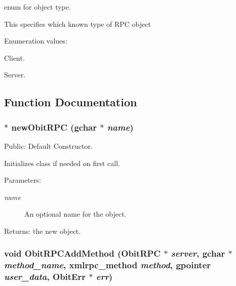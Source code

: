 enum for object type. 

This specifies which known type of RPC object \begin{Desc}
\item[Enumeration values: ]\par
\begin{description}
\item[{\em 
OBIT\_\-RPC\_\-Client\label{ObitRPC_8h_a26a6}
}]Client. \item[{\em 
OBIT\_\-RPC\_\-Server\label{ObitRPC_8h_a26a7}
}]Server. \end{description}
\end{Desc}



\subsection{Function Documentation}
\subsubsection{$\ast$ new\-Obit\-RPC (gchar $\ast$ {\em name})}\label{ObitRPC_8h_a16}


Public: Default Constructor. 

Initializes class if needed on first call. \begin{Desc}
\item[Parameters:]
\begin{description}
\item[{\em name}]An optional name for the object. \end{description}
\end{Desc}
\begin{Desc}
\item[Returns:]the new object. \end{Desc}
\subsubsection{\setlength{\rightskip}{0pt plus 5cm}void Obit\-RPCAdd\-Method ({\bf Obit\-RPC} $\ast$ {\em server}, gchar $\ast$ {\em method\_\-name}, xmlrpc\_\-method {\em method}, gpointer {\em user\_\-data}, {\bf Obit\-Err} $\ast$ {\em err})}\label{ObitRPC_8h_a23}


